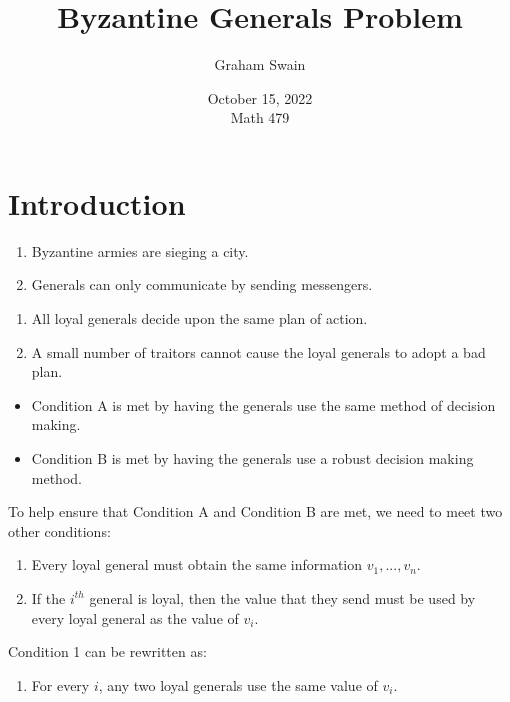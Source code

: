 \documentclass{beamer}
\title{Byzantine Generals Problem}
\author[ Graham Swain \\ \quad \\ WCU]{Graham Swain}
\date{October 15, 2022 \\ Math 479}
\theoremstyle{conjecture1}
\theoremstyle{conjecture2}
\begin{document}
\frame{\titlepage}


\section{Introduction}

\begin{frame}
    \begin{enumerate}[label={$\bullet$}]
        \item Byzantine armies are sieging a city.
        \item<2-> Generals can only communicate by sending messengers.
    \end{enumerate}
    
\end{frame}

\begin{frame}
    \begin{enumerate}[label={\Alph*.}]
        \item All loyal generals decide upon the same plan of action.
        \item<2-> A small number of traitors cannot cause the loyal generals to adopt a bad plan.
    \end{enumerate}
\end{frame}

\begin{frame}
    \begin{itemize}[label={$\bullet$}]
        \item Condition A is met by having the generals use the same method of decision making.
        \item<2-> Condition B is met by having the generals use a robust decision making method.
    \end{itemize}
\end{frame}

\begin{frame}
    To help ensure that Condition A and Condition B are met, we need to meet two other conditions:
    \begin{enumerate}[label={\arabic{enumi}.}]
        \item<2-> Every loyal general must obtain the same information $v_1,...,v_n$.
        \item<3-> {
            If the $i^{th}$ general is loyal, then the value that they send must be used by every loyal 
            general as the value of $v_i$.
        }
    \end{enumerate}
    \vspace{10pt}
     {Condition 1 can be rewritten as:}
    \begin{enumerate}[label={\arabic{enumi}$^\prime$.}]
        \item<4-> For every $i$, any two loyal generals use the same value of $v_i$.
    \end{enumerate} 
\end{frame}
\end{document}
